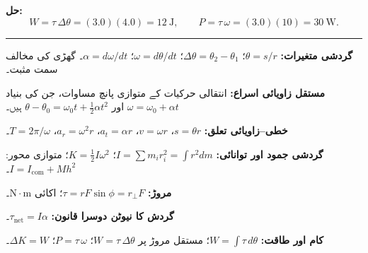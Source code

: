 \documentclass[12pt]{article}
\newcommand{\bigheading}[1]{%
  \par\vspace{10pt}{\color{seccolor}\LARGE\bfseries #1}\par
  {\color{rulecolor}\rule{\linewidth}{1.2pt}}\par\vspace{4pt}}
\newcommand{\m}[1]{\textenglish{$#1$}}
\begin{document}
\textbf{حل:}
\[ W = \tau\,\Delta\theta = (3.0)(4.0) = 12\ \mathrm{J}, \qquad P = \tau\,\omega = (3.0)(10) = 30\ \mathrm{W}. \]

\bigheading{خلاصہ}

\textbf{گردشی متغیرات:} \m{\theta = s/r}؛ \m{\Delta\theta = \theta_2-\theta_1}؛ \m{\omega = d\theta/dt}؛ \m{\alpha = d\omega/dt}۔ گھڑی کی مخالف سمت مثبت۔

\textbf{مستقل زاویائی اسراع:} انتقالی حرکیات کے متوازی پانچ مساوات، جن کی بنیاد \m{\omega = \omega_0 + \alpha t} اور \m{\theta-\theta_0 = \omega_0 t + \tfrac{1}{2}\alpha t^2} ہیں۔

\textbf{خطی–زاویائی تعلق:} \m{s = \theta r}، \m{v = \omega r}، \m{a_t = \alpha r}، \m{a_r = \omega^2 r}، \m{T = 2\pi/\omega}۔

\textbf{گردشی جمود اور توانائی:} \m{I = \sum m_i r_i^2 = \int r^2 dm}؛ \m{K = \tfrac{1}{2}I\omega^2}؛ متوازی محور: \m{I = I_{\text{com}} + Mh^2}۔

\textbf{مروڑ:} \m{\tau = rF\sin\phi = r_\perp F}؛ اکائی \m{\mathrm{N\cdot m}}۔

\textbf{گردش کا نیوٹن دوسرا قانون:} \m{\tau_{\text{net}} = I\alpha}۔

\textbf{کام اور طاقت:} \m{W = \int \tau\, d\theta}؛ مستقل مروڑ پر \m{W = \tau\,\Delta\theta}؛ \m{P = \tau\,\omega}؛ \m{\Delta K = W}۔
\end{document}
